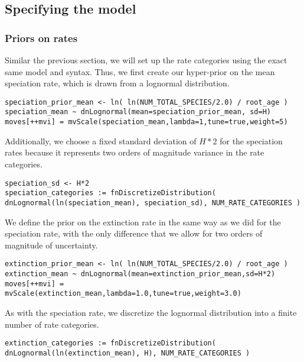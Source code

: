 \subsection{Specifying the model}

\subsubsection{Priors on rates}
Similar the previous section, we will set up the rate categories using the exact same model and \Rev syntax.
Thus, we first create our hyper-prior on the mean speciation rate, which is drawn from a lognormal distribution.
{\tt \begin{snugshade*}
\begin{lstlisting}
speciation_prior_mean <- ln( ln(NUM_TOTAL_SPECIES/2.0) / root_age )
speciation_mean ~ dnLognormal(mean=speciation_prior_mean, sd=H)
moves[++mvi] = mvScale(speciation_mean,lambda=1,tune=true,weight=5)
\end{lstlisting}
\end{snugshade*}}
Additionally, we choose a fixed standard deviation of $H*2$ for the speciation rates because it represents two orders of magnitude variance in the rate categories.
{\tt \begin{snugshade*}
\begin{lstlisting}
speciation_sd <- H*2
speciation_categories := fnDiscretizeDistribution( dnLognormal(ln(speciation_mean), speciation_sd), NUM_RATE_CATEGORIES )
\end{lstlisting}
\end{snugshade*}}
We define the prior on the extinction rate in the same way as we did for the speciation rate, with the only difference that we allow for two orders of magnitude of uncertainty.
{\tt \begin{snugshade*}
\begin{lstlisting}
extinction_prior_mean <- ln( ln(NUM_TOTAL_SPECIES/2.0) / root_age )
extinction_mean ~ dnLognormal(mean=extinction_prior_mean,sd=H*2)
moves[++mvi] = mvScale(extinction_mean,lambda=1.0,tune=true,weight=3.0)
\end{lstlisting}
\end{snugshade*}}

As with the speciation rate, we discretize the lognormal distribution into a finite number of rate categories.
{\tt \begin{snugshade*}
\begin{lstlisting}
extinction_categories := fnDiscretizeDistribution( dnLognormal(ln(extinction_mean), H), NUM_RATE_CATEGORIES )
\end{lstlisting}
\end{snugshade*}}

